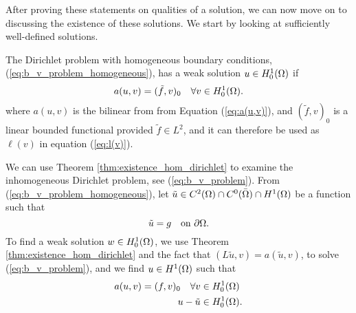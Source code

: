 After proving these statements on qualities of a solution, we can now move 
on to discussing the existence of these solutions. We start by looking at 
sufficiently well-defined solutions.
\begin{defn}{\quad}
    The Dirichlet problem with homogeneous boundary conditions,
     (\ref{eq:b_v_problem_homogeneous}), has a weak solution $u\in H_0^1(\Omega)$
     if 
     \begin{equation*}
        a(u,v) = (\tilde{f},v)_0 \quad \forall v \in H_0^1(\Omega).
     \end{equation*}
     where $a(u,v)$ is the bilinear from from Equation (\ref{eq:a(u,v)}), 
     and $(\tilde{f},v)_0$ is a linear bounded functional provided $\tilde{f}\in L^2$, and it can therefore be used as $\ell(v)$ in equation (\ref{eq:l(v)}).
\end{defn}





We can use Theorem \ref{thm:existence_hom_dirichlet} to examine the inhomogeneous Dirichlet problem, 
see (\ref{eq:b_v_problem}). From (\ref{eq:b_v_problem_homogeneous}), let 
$\tilde{u} \in C^2(\Omega)\cap C^0(\bar{\Omega}) \cap H^1(\Omega)$ be a function such that 
\begin{equation*}
   \tilde{u} = g \quad \text{on } \partial \Omega.
\end{equation*}
To find a weak solution $w \in H_0^1(\Omega)$, we use Theorem \ref{thm:existence_hom_dirichlet} and the 
fact that $(L\tilde{u},v) = a(\tilde{u},v)$, to solve (\ref{eq:b_v_problem}), and
we find $u \in H^1(\Omega)$ such that 
\begin{align*}
   a(u,v) = (f,v)_0 \quad \forall v &\in H_0^1(\Omega) \\
   u-\tilde{u} & \in H_0^1(\Omega).
\end{align*}
